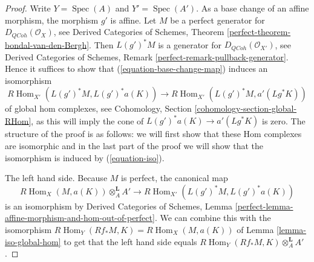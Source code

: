 \documentclass{stacks-project}
\theoremstyle{plain}
\theoremstyle{definition}
\theoremstyle{remark}
\numberwithin{equation}{subsection}
\def\Spec{\mathop{\mathrm{Spec}}}
\def\Hom{\mathop{\mathrm{Hom}}\nolimits}
\def\QCoh{\mathit{QCoh}}
\begin{document}
\begin{proof}
Write $Y = \Spec(A)$ and $Y' = \Spec(A')$. As a base change of an affine
morphism, the morphism $g'$ is affine. Let $M$ be a perfect generator
for $D_\QCoh(\mathcal{O}_X)$, see Derived Categories of Schemes, Theorem
\ref{perfect-theorem-bondal-van-den-Bergh}. Then $L(g')^*M$ is a
generator for $D_\QCoh(\mathcal{O}_{X'})$, see
Derived Categories of Schemes, Remark \ref{perfect-remark-pullback-generator}.
Hence it suffices to show that (\ref{equation-base-change-map})
induces an isomorphism
\begin{equation}
\label{equation-iso}
R\Hom_{X'}(L(g')^*M, L(g')^*a(K))
\longrightarrow
R\Hom_{X'}(L(g')^*M, a'(Lg^*K))
\end{equation}
of global hom complexes, see
Cohomology, Section \ref{cohomology-section-global-RHom},
as this will imply the cone of $L(g')^*a(K) \to a'(Lg^*K)$
is zero.
The structure of the proof is as follows: we will first show that
these Hom complexes are isomorphic and in the last part of the proof
we will show that the isomorphism is induced by (\ref{equation-iso}).

\medskip\noindent
The left hand side. Because $M$ is perfect, the canonical map
$$
R\Hom_X(M, a(K)) \otimes^\mathbf{L}_A A'
\longrightarrow
R\Hom_{X'}(L(g')^*M, L(g')^*a(K))
$$
is an isomorphism by Derived Categories of Schemes, Lemma
\ref{perfect-lemma-affine-morphism-and-hom-out-of-perfect}.
We can combine this with the isomorphism
$R\Hom_Y(Rf_*M, K) = R\Hom_X(M, a(K))$
of Lemma \ref{lemma-iso-global-hom}
to get that the left hand side equals
$R\Hom_Y(Rf_*M, K) \otimes^\mathbf{L}_A A'$.


\end{proof}
\end{document}
